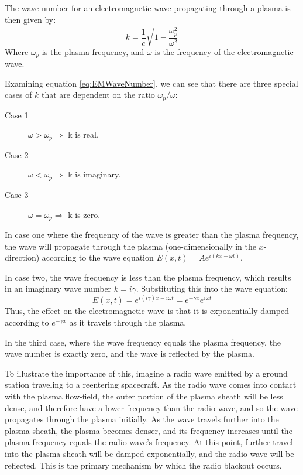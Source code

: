\documentclass[twocolumn]{article}
\begin{document}
The wave number for an electromagnetic wave propagating through a plasma is then given by:
\begin{equation}
	\label{eq:EMWaveNumber}
	k = \frac{1}{c}\sqrt{1-\frac{\omega^2_p}{\omega^2}}	
\end{equation}
Where $\omega_p$ is the plasma frequency, and $\omega$ is the frequency of the electromagnetic wave.

Examining equation \ref{eq:EMWaveNumber}, we can see that there are three special cases of $k$ that are dependent on the ratio $\omega_p/\omega$:
\begin{description}
	\item [Case 1]$\omega > \omega_p \Rightarrow$ k is real.
	\item [Case 2]$\omega < \omega_p \Rightarrow$ k is imaginary.
	\item [Case 3]$\omega = \omega_p \Rightarrow$ k is zero.
\end{description}

In case one where the frequency of the wave is greater than the plasma frequency, the wave will propagate through the plasma (one-dimensionally in the $x$-direction) according to the wave equation $E(x,t) = Ae^{i(kx - \omega t)}$.

In case two, the wave frequency is less than the plasma frequency, which results in an imaginary wave number $k = i\gamma$.
Substituting this into the wave equation:
\begin{equation}
	E(x,t) = e^{i(i\gamma)x - i\omega t} = e^{-\gamma x}e^{i\omega t}
\end{equation}
Thus, the effect on the electromagnetic wave is that it is exponentially damped according to $e^{-\gamma x}$ as it travels through the plasma.

In the third case, where the wave frequency equals the plasma frequency, the wave number is exactly zero, and the wave is reflected by the plasma.

To illustrate the importance of this, imagine a radio wave emitted by a ground station traveling to a reentering spacecraft.
As the radio wave comes into contact with the plasma flow-field, the outer portion of the plasma sheath will be less dense, and therefore have a lower frequency than the radio wave, and so the wave propagates through the plasma initially.
As the wave travels further into the plasma sheath, the plasma becomes denser, and its frequency increases until the plasma frequency equals the radio wave's frequency.
At this point, further travel into the plasma sheath will be damped exponentially, and the radio wave will be reflected.
This is the primary mechanism by which the radio blackout occurs.
\end{document}
